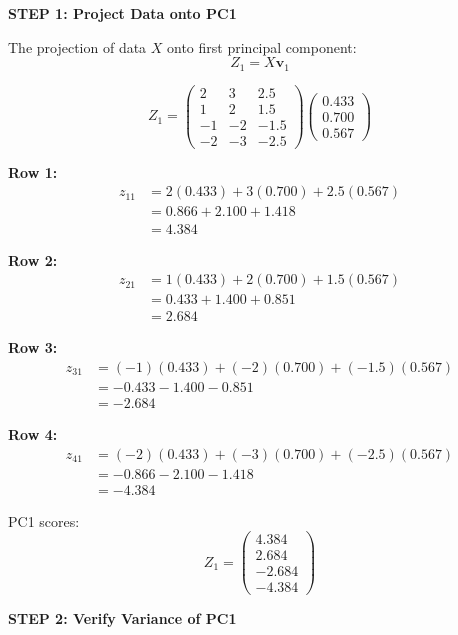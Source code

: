 \documentclass[12pt]{article}
\begin{document}
\begin{solution}

\textbf{STEP 1: Project Data onto PC1}

The projection of data $X$ onto first principal component:
\[
Z_1 = X \mathbf{v}_1
\]

\[
Z_1 = \begin{pmatrix}
2 & 3 & 2.5 \\
1 & 2 & 1.5 \\
-1 & -2 & -1.5 \\
-2 & -3 & -2.5
\end{pmatrix}\begin{pmatrix}0.433 \\ 0.700 \\ 0.567\end{pmatrix}
\]

\textbf{Row 1:}
\begin{align*}
z_{11} &= 2(0.433) + 3(0.700) + 2.5(0.567) \\
&= 0.866 + 2.100 + 1.418 \\
&= 4.384
\end{align*}

\textbf{Row 2:}
\begin{align*}
z_{21} &= 1(0.433) + 2(0.700) + 1.5(0.567) \\
&= 0.433 + 1.400 + 0.851 \\
&= 2.684
\end{align*}

\textbf{Row 3:}
\begin{align*}
z_{31} &= (-1)(0.433) + (-2)(0.700) + (-1.5)(0.567) \\
&= -0.433 - 1.400 - 0.851 \\
&= -2.684
\end{align*}

\textbf{Row 4:}
\begin{align*}
z_{41} &= (-2)(0.433) + (-3)(0.700) + (-2.5)(0.567) \\
&= -0.866 - 2.100 - 1.418 \\
&= -4.384
\end{align*}

PC1 scores:
\[
Z_1 = \begin{pmatrix}4.384 \\ 2.684 \\ -2.684 \\ -4.384\end{pmatrix}
\]

\textbf{STEP 2: Verify Variance of PC1}


\end{solution}
\end{document}
